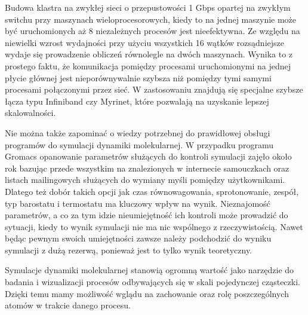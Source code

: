 Budowa klastra na zwykłej sieci o przepustowości 1 Gbps opartej na zwykłym switchu przy maszynach wieloprocesorowych, kiedy to na jednej maszynie może być uruchomionych aż 8 niezależnych procesów jest nieefektywna. Ze względu na niewielki wzrost wydajności przy użyciu wszystkich 16 wątków rozsądniejsze wydaje się prowadzenie obliczeń równolegle na dwóch maszynach. Wynika to z prostego faktu, że komunikacja pomiędzy procesami uruchomionymi na jednej płycie głównej jest nieporównywalnie szybsza niż pomiędzy tymi samymi procesami połączonymi przez sieć. W zastosowaniu znajdują się specjalne szybsze łącza typu Infiniband czy Myrinet, które pozwalają na uzyskanie lepszej skalowalności. 

Nie można także zapominać o wiedzy potrzebnej do prawidłowej obsługi programów do symulacji dynamiki molekularnej. W przypadku programu Gromacs opanowanie parametrów służących do kontroli symulacji zajęło około rok bazując przede wszystkim na znalezionych w internecie samouczkach oraz listach mailingowych służących do wymiany myśli pomiędzy użytkownikami. Dlatego też dobór takich opcji jak czas równowagowania, sprotonowanie, zespół, typ barostatu i termostatu ma kluczowy wpływ na wynik. Nieznajomość parametrów, a co za tym idzie nieumiejętność ich kontroli może prowadzić do sytuacji, kiedy to wynik symulacji nie ma nic wspólnego z rzeczywistością. Nawet będąc pewnym swoich umiejętności zawsze należy podchodzić do wyniku symulacji z dużą rezerwą, ponieważ jest to tylko wynik teoretyczny. 

Symulacje dynamiki molekularnej stanowią ogromną wartość jako narzędzie do badania i wizualizacji procesów odbywających się w skali pojedynczej cząsteczki. Dzięki temu mamy możliwość wglądu na zachowanie oraz rolę poszczególnych atomów w trakcie danego procesu. 